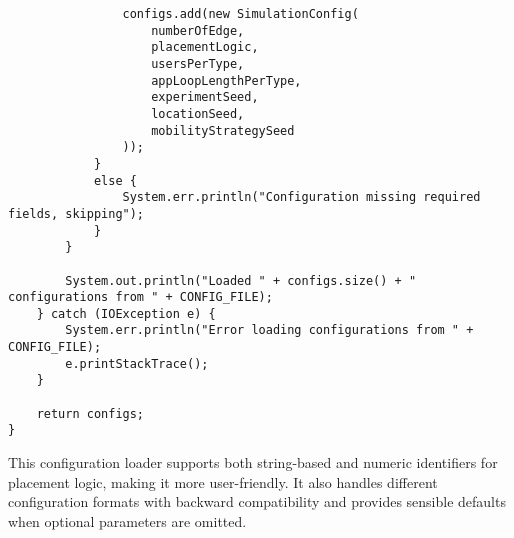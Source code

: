 \begin{verbatim}
                configs.add(new SimulationConfig(
                    numberOfEdge, 
                    placementLogic, 
                    usersPerType, 
                    appLoopLengthPerType,
                    experimentSeed,
                    locationSeed,
                    mobilityStrategySeed
                ));
            }
            else {
                System.err.println("Configuration missing required fields, skipping");
            }
        }

        System.out.println("Loaded " + configs.size() + " configurations from " + CONFIG_FILE);
    } catch (IOException e) {
        System.err.println("Error loading configurations from " + CONFIG_FILE);
        e.printStackTrace();
    }

    return configs;
}
\end{verbatim}

This configuration loader supports both string-based and numeric identifiers for placement logic, making it more user-friendly. It also handles different configuration formats with backward compatibility and provides sensible defaults when optional parameters are omitted. 